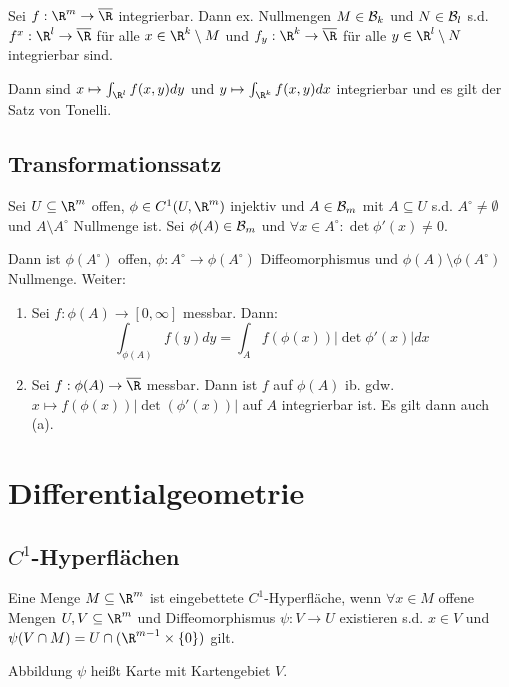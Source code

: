 Sei $f : \R^m \to \overline\R$ integrierbar. Dann ex. Nullmengen $M \in \mathcal{B}_k$ und $N \in \mathcal{B}_l$ s.d. $f^x : \R^l \to \overline\R$ für alle $x \in \R^k \setminus M$ und $f_y : \R^k \to \overline\R$ für alle $y \in \R^l \setminus N$ integrierbar sind.

Dann sind $x \mapsto \int_{\R^l} f(x,y) dy$ und $y \mapsto \int_{\R^k} f(x,y) dx$ integrierbar und es gilt der Satz von Tonelli.

\subsection*{Transformationssatz}

Sei $U \subseteq \R^m$ offen, $\phi \in C^1(U,\R^m)$ injektiv und $A \in \mathcal{B}_m$ mit $A \subseteq U$ s.d. $A^\circ \neq \emptyset$ und $A \setminus A^\circ$ Nullmenge ist. Sei $\phi(A) \in \mathcal{B}_m$ und $\forall x \in A^\circ : \det \phi'(x) \neq 0$.

Dann ist $\phi(A^\circ)$ offen, $\phi : A^\circ \to \phi(A^\circ)$ Diffeomorphismus und $\phi(A) \setminus \phi(A^\circ)$ Nullmenge. Weiter:

\begin{enumerate}[label=(\alph*)]
	\item Sei $f: \phi(A) \to [0,\infty]$ messbar. Dann: \vspace{-2mm} $$\int_{\phi(A)} f(y) dy = \int_A f(\phi(x))|\det \phi'(x)| dx$$
	\item Sei $f : \phi(A) \to \overline\R$ messbar. Dann ist $f$ auf $\phi(A)$ ib. gdw. $x \mapsto f(\phi(x))|\det(\phi'(x))|$ auf $A$ integrierbar ist. Es gilt dann auch (a).
\end{enumerate}

\section*{Differentialgeometrie}

\subsection*{$C^1$-Hyperflächen}

Eine Menge $M \subseteq \R^m$ ist eingebettete $C^1$-Hyperfläche, wenn $\forall x \in M$ offene Mengen $U, V \subseteq \R^m$ und Diffeomorphismus $\psi : V \to U$ existieren s.d. $x \in V$ und $\psi(V \cap M) = U \cap (\R^{m-1} \times \{0\})$ gilt.

\spacing

Abbildung $\psi$ heißt Karte mit Kartengebiet $V$.

